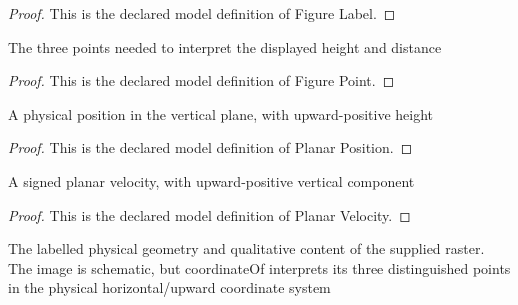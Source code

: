 \begin{proof}
  This is the declared model definition of Figure Label.
\end{proof}
\begin{definition}
  \label{def:physics:phyx-mini-0738:phyxminiproblems-problemphyxmini0738-figurepoint}
  The three points needed to interpret the displayed height and distance
\end{definition}
\begin{proof}
  This is the declared model definition of Figure Point.
\end{proof}
\begin{definition}
  \label{def:physics:phyx-mini-0738:phyxminiproblems-problemphyxmini0738-planarposition}
  A physical position in the vertical plane, with upward-positive height
\end{definition}
\begin{proof}
  This is the declared model definition of Planar Position.
\end{proof}
\begin{definition}
  \label{def:physics:phyx-mini-0738:phyxminiproblems-problemphyxmini0738-planarvelocity}
  A signed planar velocity, with upward-positive vertical component
\end{definition}
\begin{proof}
  This is the declared model definition of Planar Velocity.
\end{proof}
\begin{definition}
  \label{def:physics:phyx-mini-0738:phyxminiproblems-problemphyxmini0738-airplanedecoyfigure}
  The labelled physical geometry and qualitative content of the supplied raster. The image is schematic, but coordinateOf interprets its three distinguished points in the physical horizontal/upward coordinate system
\end{definition}
